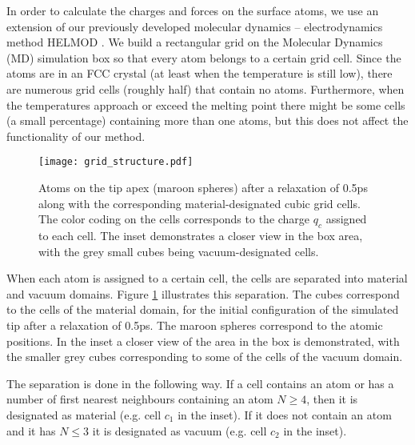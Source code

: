 \documentclass[%
 aps,
 prb,%
 amsmath,amssymb,
reprint,%
superscriptaddress,
]{revtex4-1}
\begin{document}
In order to calculate the charges and forces on the surface atoms, we use an extension of our previously developed molecular dynamics -- electrodynamics method HELMOD \cite{Djurabekova2011}.
We build a rectangular grid on the Molecular Dynamics (MD) simulation box so that every atom belongs to a certain grid cell. Since the atoms are in an FCC crystal (at least when the temperature is still low), there are numerous grid cells (roughly half) that contain no atoms.
Furthermore, when the temperatures approach or exceed the melting point there might be some cells (a small percentage) containing more than one atoms, but this does not affect the functionality of our method.

\begin{figure}[htbp]
	\centering
    \texttt{[image: grid\_structure.pdf]}
    \caption{Atoms on the tip apex (maroon spheres) after a relaxation of 0.5ps along with the corresponding material-designated cubic grid cells. The color coding on the cells corresponds to the charge $q_c$ assigned to each cell. The inset demonstrates a closer view in the box area, with the grey small cubes being vacuum-designated cells.}
    \label{fig:grid}
\end{figure} 

When each atom is assigned to a certain cell, the cells are separated into material and vacuum domains. Figure \ref{fig:grid} illustrates this separation. The cubes correspond to the cells of the material domain, for the initial configuration of the simulated tip after a relaxation of 0.5ps. The maroon spheres correspond to the atomic positions. In the inset a closer view of the area in the box is demonstrated, with the smaller grey cubes corresponding to some of the cells of the vacuum domain. 

The separation is done in the following way. If a cell contains an atom or has a number of first nearest neighbours containing an atom $N \geq 4$, then it is designated as material (e.g. cell $c_1$ in the inset). If it does not contain an atom and it has $N \leq 3$ it is designated as vacuum (e.g. cell $c_2$ in the inset). 
\end{document}
